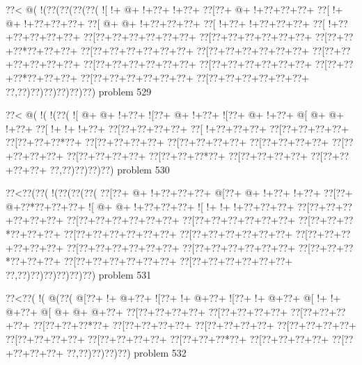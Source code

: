 \vbox{\vbox{\goo
\0??<\- @(\- !(\0??(\0??(\0??(\0??(
\- ![\- !+\- @+\- !+\0??+\- !+\0??+
\0??[\0??+\- @+\- !+\0??+\0??+\0??+
\0??[\- !+\- @+\- !+\0??+\0??+\0??+
\0??[\- @+\- @+\- !+\0??+\0??+\0??+
\0??[\- !+\0??+\- !+\0??+\0??+\0??+
\0??[\- !+\0??+\0??+\0??+\0??+\0??+
\0??[\0??+\0??+\0??+\0??+\0??+\0??+
\0??[\0??+\0??+\0??+\0??+\0??+\0??+
\0??[\0??+\0??+\0??*\0??+\0??+\0??+
\0??[\0??+\0??+\0??+\0??+\0??+\0??+
\0??[\0??+\0??+\0??+\0??+\0??+\0??+
\0??[\0??+\0??+\0??+\0??+\0??+\0??+
\0??[\0??+\0??+\0??+\0??+\0??+\0??+
\0??[\0??+\0??+\0??+\0??+\0??+\0??+
\0??[\0??+\0??+\0??*\0??+\0??+\0??+
\0??[\0??+\0??+\0??+\0??+\0??+\0??+
\0??[\0??+\0??+\0??+\0??+\0??+\0??+
\0??,\0??)\0??)\0??)\0??)\0??)\0??)
}
\hfil problem 529\hfil\break
}

\vbox{\vbox{\goo
\0??<\- @(\- !(\- !(\0??(
\- ![\- @+\- @+\- !+\0??+
\- ![\0??+\- @+\- !+\0??+
\- ![\0??+\- @+\- !+\0??+
\- @[\- @+\- @+\- !+\0??+
\0??[\- !+\- !+\- !+\0??+
\0??[\0??+\0??+\0??+\0??+
\0??[\- !+\0??+\0??+\0??+
\0??[\0??+\0??+\0??+\0??+
\0??[\0??+\0??+\0??*\0??+
\0??[\0??+\0??+\0??+\0??+
\0??[\0??+\0??+\0??+\0??+
\0??[\0??+\0??+\0??+\0??+
\0??[\0??+\0??+\0??+\0??+
\0??[\0??+\0??+\0??+\0??+
\0??[\0??+\0??+\0??*\0??+
\0??[\0??+\0??+\0??+\0??+
\0??[\0??+\0??+\0??+\0??+
\0??,\0??)\0??)\0??)\0??)
}
\hfil problem 530\hfil\break
}

\vbox{\vbox{\goo
\0??<\0??(\0??(\- !(\0??(\0??(\0??(
\0??[\0??+\- @+\- !+\0??+\0??+\0??+
\- @[\0??+\- @+\- !+\0??+\- !+\0??+
\0??[\0??+\- @+\0??*\0??+\0??+\0??+
\- ![\- @+\- @+\- !+\0??+\0??+\0??+
\- ![\- !+\- !+\- !+\0??+\0??+\0??+
\0??[\0??+\0??+\0??+\0??+\0??+\0??+
\0??[\0??+\0??+\0??+\0??+\0??+\0??+
\0??[\0??+\0??+\0??+\0??+\0??+\0??+
\0??[\0??+\0??+\0??*\0??+\0??+\0??+
\0??[\0??+\0??+\0??+\0??+\0??+\0??+
\0??[\0??+\0??+\0??+\0??+\0??+\0??+
\0??[\0??+\0??+\0??+\0??+\0??+\0??+
\0??[\0??+\0??+\0??+\0??+\0??+\0??+
\0??[\0??+\0??+\0??+\0??+\0??+\0??+
\0??[\0??+\0??+\0??*\0??+\0??+\0??+
\0??[\0??+\0??+\0??+\0??+\0??+\0??+
\0??[\0??+\0??+\0??+\0??+\0??+\0??+
\0??,\0??)\0??)\0??)\0??)\0??)\0??)
}
\hfil problem 531\hfil\break
}

\vbox{\vbox{\goo
\0??<\0??(\- !(\- @(\0??(
\- @[\0??+\- !+\- @+\0??+
\- ![\0??+\- !+\- @+\0??+
\- ![\0??+\- !+\- @+\0??+
\- @[\- !+\- !+\- @+\0??+
\- @[\- @+\- @+\- @+\0??+
\0??[\0??+\0??+\0??+\0??+
\0??[\0??+\0??+\0??+\0??+
\0??[\0??+\0??+\0??+\0??+
\0??[\0??+\0??+\0??*\0??+
\0??[\0??+\0??+\0??+\0??+
\0??[\0??+\0??+\0??+\0??+
\0??[\0??+\0??+\0??+\0??+
\0??[\0??+\0??+\0??+\0??+
\0??[\0??+\0??+\0??+\0??+
\0??[\0??+\0??+\0??*\0??+
\0??[\0??+\0??+\0??+\0??+
\0??[\0??+\0??+\0??+\0??+
\0??,\0??)\0??)\0??)\0??)
}
\hfil problem 532\hfil\break
}

